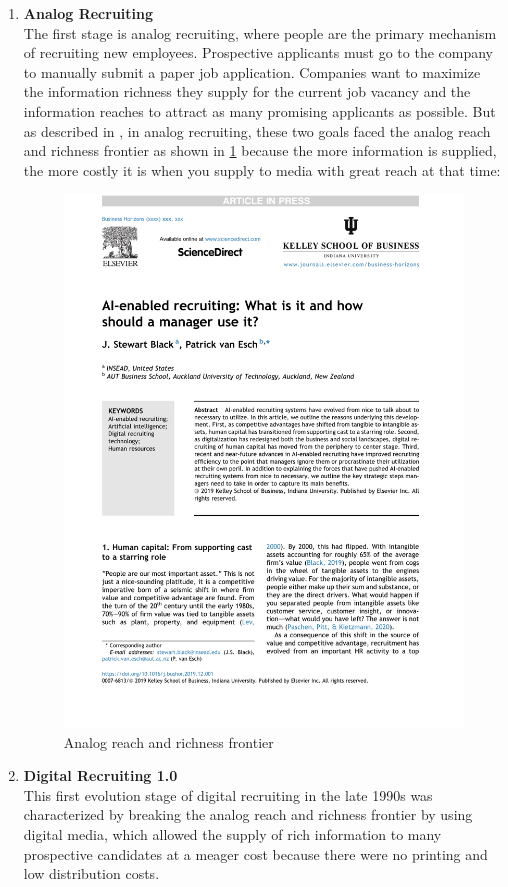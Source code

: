 \documentclass[draft,final]{thesisclass} %
\begin{document}
\begin{enumerate}
    \item \textbf{Analog Recruiting} \label{analog_recruting}\\
    The first stage is analog recruiting, where people are the primary mechanism of recruiting new employees.
    Prospective applicants must go to the company to manually submit a paper job application.
    Companies want to maximize the information richness they supply for the current job vacancy and the information reaches to attract as many promising applicants as possible.
    But as described in \textcite[2]{ai_recruiting}, in analog recruiting, these two goals faced the analog reach and richness frontier as shown in \ref{fig:analog_reach_richness_frontier} because the more information is supplied, the more costly it is when you supply to media with great reach at that time:
    \begin{figure}[H]
        \centering
        \includegraphics[scale=0.5,page=2,width=0.6\linewidth,trim={300 100 55 515},clip]{literature/ai_recruiting.pdf}
        \caption{Analog reach and richness frontier \parencite[2]{ai_recruiting}}
        \label{fig:analog_reach_richness_frontier}
    \end{figure}
    \item \textbf{Digital Recruiting 1.0} \label{digital_recruiting_1}\\
    This first evolution stage of digital recruiting in the late 1990s was characterized by breaking the analog reach and richness frontier by using digital media, which allowed the supply of rich information to many prospective candidates at a meager cost because there were no printing and low distribution costs.

\end{enumerate}
\end{document}
